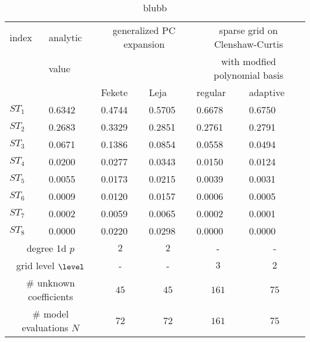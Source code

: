 
\begin{table}[!ht]
  \fontsize{8pt}{3ex}\selectfont
  \renewcommand{\arraystretch}{1.2}
  \begin{tabularx}{\textwidth}{XXXXXX}
    \toprule
    index &
    analytic &
    \multicolumn{2}{c}{generalized PC expansion} &
    \multicolumn{2}{c}{sparse grid on Clenshaw-Curtis} \\
    & value & & &
    \multicolumn{2}{c}{with modfied polynomial basis} \\
    \hline
    & &
    \multicolumn{1}{l}{Fekete} &
    \multicolumn{1}{l}{Leja} &
    \multicolumn{1}{l}{regular} &
    \multicolumn{1}{l}{adaptive} \\
    \toprule
    $ST_1$ & 0.6342 & 0.4744 & 0.5705 & 0.6678 & 0.6750 \\
    $ST_2$ & 0.2683 & 0.3329 & 0.2851 & 0.2761 & 0.2791 \\
    $ST_3$ & 0.0671 & 0.1386 & 0.0854 & 0.0558 & 0.0494 \\
    $ST_4$ & 0.0200 & 0.0277 & 0.0343 & 0.0150 & 0.0124 \\
    $ST_5$ & 0.0055 & 0.0173 & 0.0215 & 0.0039 & 0.0031 \\
    $ST_6$ & 0.0009 & 0.0120 & 0.0157 & 0.0006 & 0.0005 \\
    $ST_7$ & 0.0002 & 0.0059 & 0.0065 & 0.0002 & 0.0001 \\
    $ST_8$ & 0.0000 & 0.0220 & 0.0298 & 0.0000 & 0.0000 \\
    \hline
    \multicolumn{2}{c}{degree 1d $p$} &
    \multicolumn{1}{c}{$2$} &
    \multicolumn{1}{c}{$2$} &
    \multicolumn{1}{c}{-} &
    \multicolumn{1}{c}{-} \\
    \multicolumn{2}{c}{grid level $\level$} &
    \multicolumn{1}{c}{-} &
    \multicolumn{1}{c}{-} &
    \multicolumn{1}{c}{$3$} &
    \multicolumn{1}{c}{$2$} \\
    \multicolumn{2}{c}{\# unknown coefficients} &
    \multicolumn{1}{c}{$45$} &
    \multicolumn{1}{c}{$45$} &
    \multicolumn{1}{c}{$161$} &
    \multicolumn{1}{c}{$75$} \\
    \multicolumn{2}{c}{\# model evaluations $N$} &
    \multicolumn{1}{c}{$72$} &
    \multicolumn{1}{c}{$72$} &
    \multicolumn{1}{c}{$161$} &
    \multicolumn{1}{c}{$75$} \\
    \bottomrule
  \end{tabularx}
  \caption{blubb}
  \label{tab::sobolgfunction-full-model-anova}
\end{table}
